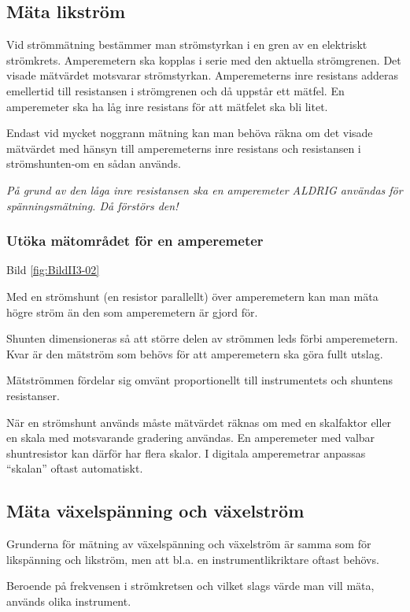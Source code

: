 \subsection{Mäta likström}

Vid strömmätning bestämmer man strömstyrkan i en gren av en elektriskt
strömkrets.  Amperemetern ska kopplas i serie med den aktuella
strömgrenen.  Det visade mätvärdet motsvarar strömstyrkan.
Amperemeterns inre resistans adderas emellertid till resistansen i
strömgrenen och då uppstår ett mätfel.  En amperemeter ska ha låg
inre resistans för att mätfelet ska bli litet.

Endast vid mycket noggrann mätning kan man behöva räkna om det visade
mätvärdet med hänsyn till amperemeterns inre resistans och resistansen
i strömshunten-om en sådan används.

\emph{På grund av den låga inre resistansen ska en amperemeter
  ALDRIG användas för spänningsmätning. Då förstörs den!}

\subsubsection{Utöka mätområdet för en amperemeter}

Bild \ref{fig:BildII3-02}

Med en strömshunt (en resistor parallellt) över amperemetern kan man
mäta högre ström än den som amperemetern är gjord för.

Shunten dimensioneras så att större delen av strömmen leds förbi
amperemetern.  Kvar är den mätström som behövs för att amperemetern
ska göra fullt utslag.

Mätströmmen fördelar sig omvänt proportionellt till instrumentets och
shuntens resistanser.

När en strömshunt används måste mätvärdet räknas om med en skalfaktor
eller en skala med motsvarande gradering användas. En amperemeter med
valbar shuntresistor kan därför har flera skalor. I digitala
amperemetrar anpassas ``skalan'' oftast automatiskt.

\subsection{Mäta växelspänning och växelström}

Grunderna för mätning av växelspänning och växelström är samma som för
likspänning och likström, men att bl.a. en instrumentlikriktare oftast
behövs.

Beroende på frekvensen i strömkretsen och vilket slags värde man vill
mäta, används olika instrument.

